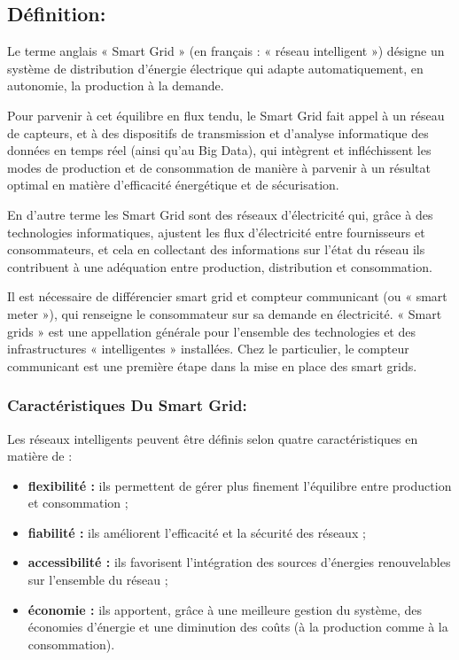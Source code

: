 \subsection{Définition:}
Le terme anglais « Smart Grid » (en français : « réseau intelligent ») désigne un système de distribution d’énergie électrique qui adapte automatiquement, en autonomie, la production à la demande.

Pour parvenir à cet équilibre en flux tendu, le Smart Grid fait appel à un réseau de capteurs, et à des dispositifs de transmission et d’analyse informatique des données en temps réel (ainsi qu’au Big Data), qui intègrent et infléchissent les modes de production et de consommation de manière à parvenir à un résultat optimal en matière d’efficacité énergétique et de sécurisation.

En d'autre terme les Smart Grid sont des réseaux d’électricité qui, grâce à des technologies informatiques, ajustent les flux d’électricité entre fournisseurs et consommateurs, et cela en collectant des informations sur l’état du réseau ils contribuent à une adéquation entre production, distribution et consommation.

Il est nécessaire de différencier smart grid et compteur communicant (ou « smart meter »), qui renseigne le consommateur sur sa demande en électricité. « Smart grids » est une appellation générale pour l’ensemble des technologies et des infrastructures « intelligentes » installées. Chez le particulier, le compteur communicant est une première étape dans la mise en place des smart grids.

\subsubsection*{Caractéristiques Du Smart Grid:}

Les réseaux intelligents peuvent être définis selon quatre caractéristiques en matière de :
\begin{itemize}[label=\textbullet]
\item \textbf{flexibilité :} ils permettent de gérer plus finement l’équilibre entre production et consommation ;
\item \textbf{fiabilité :} ils améliorent l’efficacité et la sécurité des réseaux ;
\item \textbf{accessibilité :} ils favorisent l’intégration des sources d’énergies renouvelables sur l’ensemble du réseau ;
\item \textbf{économie :} ils apportent, grâce à une meilleure gestion du système, des économies d’énergie et une diminution des coûts (à la production comme à la consommation).
\end{itemize}

